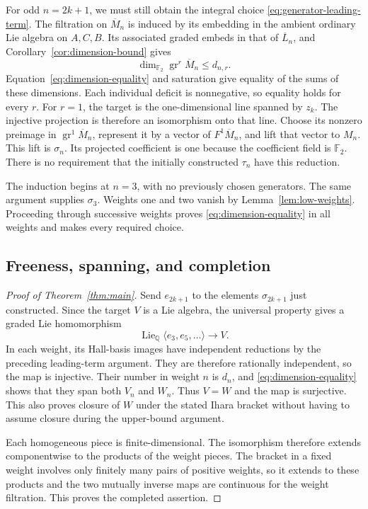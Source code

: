 \documentclass[11pt]{article}
\newcommand{\Q}{\mathbb Q}
\newcommand{\F}{{\mathbb F_2}}
\newcommand{\Lie}{\operatorname{Lie}}
\DeclareMathOperator{\gr}{gr}
\theoremstyle{definition}
\theoremstyle{remark}
\numberwithin{equation}{section}
\begin{document}
For odd \(n=2k+1\), we must still obtain the integral choice
\eqref{eq:generator-leading-term}.
The filtration on \(\overline M_n\) is induced by its embedding in
the ambient ordinary Lie algebra on \(A,C,B\).  Its associated
graded embeds in that of \(\overline L_n\), and
Corollary~\ref{cor:dimension-bound} gives
\[
 \dim_\F\gr^r\overline M_n\le d_{n,r}.
\]
Equation~\eqref{eq:dimension-equality} and saturation give equality
of the sums of these dimensions.  Each individual deficit is
nonnegative, so equality holds for every \(r\).
For \(r=1\), the target is the one-dimensional line spanned by
\(z_k\).  The injective projection is therefore an isomorphism
onto that line.
Choose its nonzero preimage in \(\gr^1\overline M_n\), represent
it by a vector of \(F^1\overline M_n\), and lift that vector to
\(M_n\).  This lift is \(\sigma_n\).  Its projected coefficient
is one because the coefficient field is \(\F\).
There is no requirement that the initially constructed
\(\tau_n\) have this reduction.

The induction begins at \(n=3\), with no previously chosen
generators.  The same argument supplies \(\sigma_3\).
Weights one and two vanish by Lemma~\ref{lem:low-weights}.
Proceeding through successive weights proves
\eqref{eq:dimension-equality} in all weights and makes every
required choice.

\subsection{Freeness, spanning, and completion}
\begin{proof}[Proof of Theorem~\ref{thm:main}]
\label{thm:main-proof}
Send \(e_{2k+1}\) to the elements \(\sigma_{2k+1}\) just
constructed.  Since the target \(V\) is a Lie algebra, the
universal property gives a graded Lie homomorphism
\[
 \Lie_\Q\langle e_3,e_5,\ldots\rangle\longrightarrow V.
\]
In each weight, its Hall-basis images have independent
reductions by the preceding leading-term argument.  They are
therefore rationally independent, so the map is injective.
Their number in weight \(n\) is \(d_n\), and
\eqref{eq:dimension-equality} shows that they span both \(V_n\)
and \(W_n\).  Thus \(V=W\) and the map is surjective.
This also proves closure of \(W\) under the stated Ihara bracket
without having to assume closure during the upper-bound argument.

Each homogeneous piece is finite-dimensional.  The isomorphism
therefore extends componentwise to the products of the weight
pieces.  The bracket in a fixed weight involves only finitely
many pairs of positive weights, so it extends to these products
and the two mutually inverse maps are continuous for the weight
filtration.  This proves the completed assertion.
\end{proof}
\end{document}

